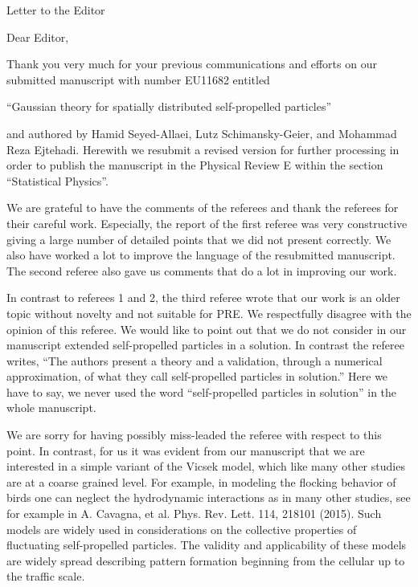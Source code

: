 \documentclass[a4paper,11pt]{letter}
\begin{document}
\longindentation=0pt

\signature{Hamid Seyed-Allaei (in the name of the co-autors)}
\address{Sharif University of Technology \\ Azadi Avenue \\ Tehran, Iran}

\date{\today}


\begin{letter}{Letter to the Editor}


\opening{Dear Editor,}

Thank you very much for your previous communications and efforts on our submitted manuscript with number EU11682 entitled

``Gaussian theory for spatially distributed self-propelled particles''

and authored by Hamid Seyed-Allaei, Lutz Schimansky-Geier, and Mohammad Reza Ejtehadi. Herewith we resubmit a revised version for further processing in order to publish the manuscript in the Physical Review E within the section ``Statistical Physics''.

We are grateful to have the comments of the referees and thank the referees for their careful work. Especially, the report of the first referee was very constructive giving a large number of detailed points that we did not present correctly. We also have worked a lot to improve the language of the resubmitted manuscript. The second referee also gave us comments that do a lot in improving our work. 

In contrast to referees 1 and 2, the third referee wrote that our work is an older topic without novelty and not suitable for PRE. We respectfully disagree with the opinion of this referee. We would like to point out that we do not consider in our manuscript extended self-propelled particles in a solution. In contrast the referee writes, ``The authors present a theory and a validation, through a numerical approximation, of what they call self-propelled particles in solution.'' Here we have to say, we never used the word ``self-propelled particles in solution'' in the whole manuscript.

We are sorry for having possibly miss-leaded the referee with respect to this point. In contrast, for us it was evident from our manuscript that we are interested in a simple variant of the Vicsek model, which like many other studies are at a coarse grained level. For example, in modeling the flocking behavior of birds one can neglect the hydrodynamic interactions as in many other studies, see for example in A. Cavagna, et al. Phys. Rev. Lett. 114, 218101 (2015). Such models are widely used in considerations on the collective properties of fluctuating self-propelled particles. The validity and applicability of these models are widely spread describing pattern formation beginning from the cellular up to the traffic scale.


\end{letter}
\end{document}
